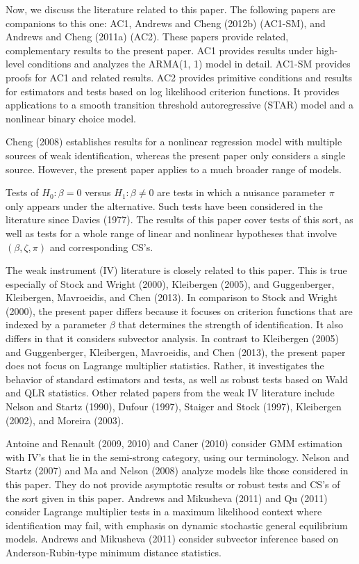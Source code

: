 \documentclass[12pt,thmsb,titlepage,final,oneside,letterpaper]{article}
\begin{document}
Now, we discuss the literature related to this paper. The following papers
are companions to this one: AC1, Andrews and Cheng (2012b) (AC1-SM), and
Andrews and Cheng (2011a) (AC2). These papers provide related, complementary
results to the present paper. AC1 provides results under high-level
conditions and analyzes the ARMA(1, 1) model in detail. AC1-SM provides
proofs for AC1 and related results. AC2 provides primitive conditions and
results for estimators and tests based on log likelihood criterion
functions. It provides applications to a smooth transition threshold
autoregressive (STAR) model and a nonlinear binary choice model.

Cheng (2008) establishes results for a nonlinear regression model with
multiple sources of weak identification, whereas the present paper only
considers a single source. However, the present paper applies to a much
broader range of models.

Tests of $H_{0}:\beta =0$ versus $H_{1}:\beta \neq 0$ are tests in which a
nuisance parameter $\pi $ only appears under the alternative. Such tests
have been considered in the literature since Davies (1977). The results of
this paper cover tests of this sort, as well as tests for a whole range of
linear and nonlinear hypotheses that involve $(\beta ,\zeta ,\pi )$ and
corresponding CS's.

The weak instrument (IV) literature is closely related to this paper. This
is true especially of Stock and Wright (2000), Kleibergen (2005), and
Guggenberger, Kleibergen, Mavroeidis, and Chen (2013). In comparison to
Stock and Wright (2000), the present paper differs because it focuses on
criterion functions that are indexed by a parameter $\beta $ that determines
the strength of identification. It also differs in that it considers
subvector analysis. In contrast to Kleibergen (2005) and Guggenberger,
Kleibergen, Mavroeidis, and Chen (2013), the present paper does not focus on
Lagrange multiplier statistics. Rather, it investigates the behavior of
standard estimators and tests, as well as robust tests based on Wald and QLR
statistics. Other related papers from the weak IV literature include Nelson
and Startz (1990), Dufour (1997), Staiger and Stock (1997), Kleibergen
(2002), and Moreira (2003).

Antoine and Renault (2009, 2010) and Caner (2010) consider GMM estimation
with IV's that lie in the semi-strong category, using our terminology.
Nelson and Startz (2007) and Ma and Nelson (2008) analyze models like those
considered in this paper. They do not provide asymptotic results or robust
tests and CS's of the sort given in this paper. Andrews and Mikusheva (2011)
and Qu (2011) consider Lagrange multiplier tests in a maximum likelihood
context where identification may fail, with emphasis on dynamic stochastic
general equilibrium models. Andrews and Mikusheva (2011) consider subvector
inference based on Anderson-Rubin-type minimum distance statistics.
\end{document}
